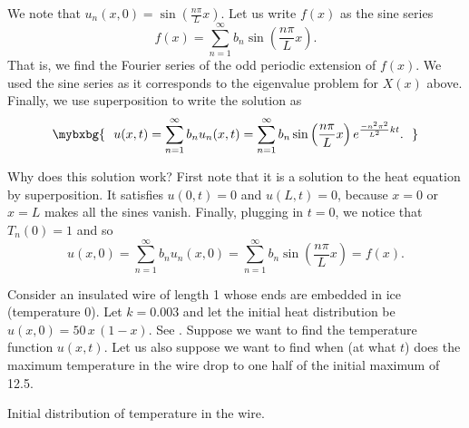 \begin{exampleSol}
We note that $u_n(x,0) = \sin \left( \frac{n \pi}{L} x \right)$.  Let us
write $f(x)$ as the sine series
\begin{equation*}
f(x) = \sum_{n=1}^\infty b_n \sin \left(\frac{n \pi}{L}  x \right) .
\end{equation*}
That is, we find the Fourier series of the odd periodic extension of $f(x)$.
We used the sine series as it corresponds to the eigenvalue problem for
$X(x)$ above.
Finally, we use superposition to write the solution as
\begin{equation*}
\mybxbg{~~
u(x,t) = 
\sum_{n=1}^\infty
b_n
u_n(x,t)
=
\sum_{n=1}^\infty
b_n
\sin \left( \frac{n \pi}{L}  x \right)
e^{\frac{-n^2 \pi^2}{L^2} k t} .
~~}
\end{equation*}
\end{exampleSol}

Why does this solution work?  First note that it is a solution to
the heat equation by superposition.  It satisfies $u(0,t) = 0$
and $u(L,t) = 0$, because $x=0$ or $x=L$ makes all the sines vanish.
Finally, plugging in $t=0$, we notice that $T_n(0) = 1$ and so
\begin{equation*}
u(x,0) = 
\sum_{n=1}^\infty
b_n
u_n(x,0)
=
\sum_{n=1}^\infty
b_n
\sin \left( \frac{n \pi}{L} x \right)
=
f(x) .
\end{equation*}

\begin{example}
Consider
an insulated wire of length 1 whose
ends are embedded in ice (temperature 0).
Let $k=0.003$ and let the initial heat distribution
be $u(x,0) = 50\,x\,(1-x)$.
See .
Suppose we want to find the temperature function $u(x,t)$.  Let us also suppose we
want to find when (at what $t$) does the maximum temperature in the wire 
drop to one half of the initial maximum of 12.5.

\begin{myfig}
\capstart
{}
\caption{Initial distribution of temperature in the
wire.\label{heat:wireexinitfig}}
\end{myfig}
\end{example}


